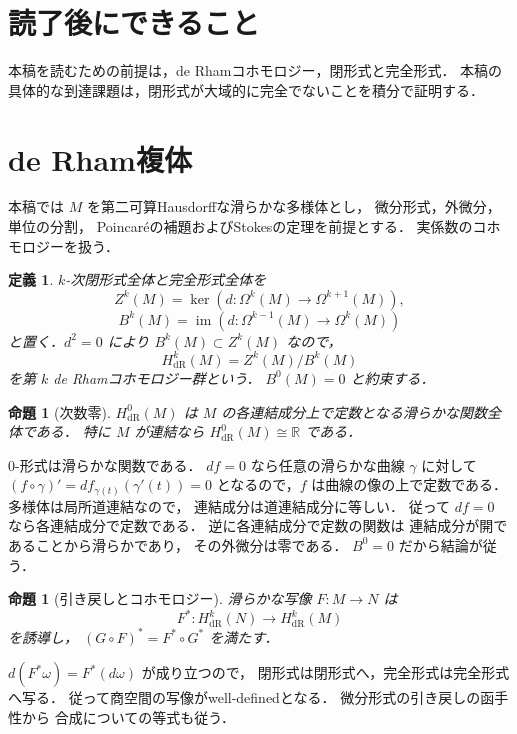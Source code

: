 \documentclass[a5paper,10pt,onecolumn]{jsarticle}
\makeatletter
\theoremstyle{mathnotetheorem}
\newtheorem{definition}[theorem]{定義}
\newtheorem{proposition}[theorem]{命題}
\renewcommand{\proofname}{証明}
\renewenvironment{proof}[1][\proofname]{%
  \par\pushQED{\qed}\normalfont\topsep4\p@\@plus2\p@\relax
  \trivlist\item[\hskip\labelsep\bfseries #1]\ignorespaces
}{\popQED\endtrivlist\@endpefalse}
\makeatother
\begin{document}
\section*{読了後にできること}
本稿を読むための前提は，de Rhamコホモロジー，閉形式と完全形式．
本稿の具体的な到達課題は，閉形式が大域的に完全でないことを積分で証明する．

\section{de Rham複体}

本稿では $M$ を第二可算Hausdorffな滑らかな多様体とし，
微分形式，外微分，単位の分割，
Poincar\'eの補題およびStokesの定理を前提とする．
実係数のコホモロジーを扱う．

\begin{definition}
$k$-次閉形式全体と完全形式全体を
\[
 Z^k(M)=\ker(d:\Omega^k(M)\to\Omega^{k+1}(M)),
\]
\[
 B^k(M)=\operatorname{im}
 (d:\Omega^{k-1}(M)\to\Omega^k(M))
\]
と置く．$d^2=0$ により $B^k(M)\subset Z^k(M)$ なので，
\[
 H_{\mathrm{dR}}^k(M)=Z^k(M)/B^k(M)
\]
を第 $k$ de Rhamコホモロジー群という．
$B^0(M)=0$ と約束する．
\end{definition}

\begin{proposition}[次数零]\label{prop:h0}
$H_{\mathrm{dR}}^0(M)$ は
$M$ の各連結成分上で定数となる滑らかな関数全体である．
特に $M$ が連結なら
$H_{\mathrm{dR}}^0(M)\cong\mathbb R$ である．
\end{proposition}
\begin{proof}
$0$-形式は滑らかな関数である．
$df=0$ なら任意の滑らかな曲線 $\gamma$ に対して
$(f\circ\gamma)'=df_{\gamma(t)}(\gamma'(t))=0$
となるので，$f$ は曲線の像の上で定数である．
多様体は局所道連結なので，
連結成分は道連結成分に等しい．
従って $df=0$ なら各連結成分で定数である．
逆に各連結成分で定数の関数は
連結成分が開であることから滑らかであり，
その外微分は零である．
$B^0=0$ だから結論が従う．
\end{proof}

\begin{proposition}[引き戻しとコホモロジー]\label{prop:pullback}
滑らかな写像 $F:M\to N$ は
\[
 F^*:H_{\mathrm{dR}}^k(N)\to H_{\mathrm{dR}}^k(M)
\]
を誘導し，
$(G\circ F)^*=F^*\circ G^*$ を満たす．
\end{proposition}
\begin{proof}
$d(F^*\omega)=F^*(d\omega)$ が成り立つので，
閉形式は閉形式へ，完全形式は完全形式へ写る．
従って商空間の写像がwell-definedとなる．
微分形式の引き戻しの函手性から
合成についての等式も従う．
\end{proof}
\end{document}
